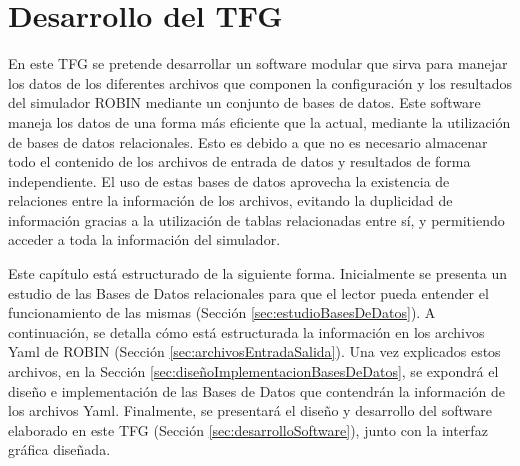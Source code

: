 \chapter{Desarrollo del TFG}
\label{ch:desarrollo}


En este \acrshort{TFG} se pretende desarrollar un software modular que sirva para manejar los datos de los diferentes archivos que componen la configuración y los resultados del simulador \acrshort{ROBIN} mediante un conjunto de bases de datos. Este software maneja los datos de una forma más eficiente que la actual, mediante la utilización de bases de datos relacionales. Esto es debido a que no es necesario almacenar todo el contenido de los archivos de entrada de datos y resultados de forma independiente. El uso de estas bases de datos aprovecha la existencia de relaciones entre la información de los archivos, evitando la duplicidad de información gracias a la utilización de tablas relacionadas entre sí, y permitiendo acceder a toda la información del simulador.

Este capítulo está estructurado de la siguiente forma. Inicialmente se presenta un estudio de las Bases de Datos relacionales para que el lector pueda entender el funcionamiento de las mismas (Sección \ref{sec:estudioBasesDeDatos}). A continuación, se detalla cómo está estructurada la información en los archivos Yaml de \acrshort{ROBIN} (Sección \ref{sec:archivosEntradaSalida}). Una vez explicados estos archivos, en la Sección \ref{sec:diseñoImplementacionBasesDeDatos}, se expondrá el diseño e implementación de las Bases de Datos que contendrán la información de los archivos Yaml. Finalmente, se presentará el diseño y desarrollo del software elaborado en este \acrshort{TFG} (Sección \ref{sec:desarrolloSoftware}), junto con la interfaz gráfica diseñada.






